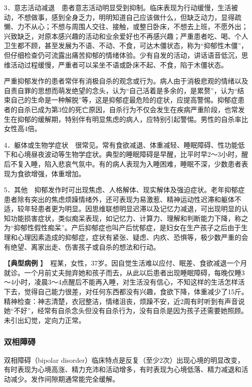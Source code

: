 3．意志活动减退　患者意志活动明显受到抑制。临床表现为行动缓慢，生活被动，不想做事，感到全身乏力，明明知道自己应该做什么，但缺乏动力，显得疏懒、力不从心；不想与周围人交往、接触，或整日卧床，不想去上班，不愿外出；兴致缺乏，对原本感兴趣的活动和业余爱好也不再感兴趣；严重患者吃、喝、个人卫生都不顾，甚至发展为不语、不动、不食，可达木僵状态，称为``抑郁性木僵''，但仔细检查仍可流露出痛苦抑郁的情绪体验。少有自发的活动，讲话语音低沉，思维活动过程缓慢，严重者可以呆坐不语或卧床不起、不食，陷于木僵状态。

严重抑郁发作的患者常伴有消极自杀的观念或行为。病人由于消极悲观的情绪以及自责自罪的思想而萌发绝望的念头，认为``自己活着是多余的，是累赘''，认为``结束自己的生命是一种解脱''等，这是抑郁症最危险的症状，应提高警惕。抑郁症患者的自杀已成为第3位的死亡原因，自杀行为不仅会发生在疾病严重阶段，也常发生在抑郁的缓解期，特别伴有明显焦虑的病人，应特别引起警惕。男性的自杀率比女性高4倍。

4．躯体或生物学症状　很常见。常有食欲减退、体重减轻、睡眠障碍、性功能低下和心境昼夜波动等生物学症状。典型的睡眠障碍是早醒，比平时早2～3小时，醒后不复入睡，陷入悲哀气氛中。有的病人表现为入睡困难，睡眠不深，少数患者表现为食欲增强，体重增加。

5．其他　抑郁发作时可出现焦虑、人格解体、现实解体及强迫症状。老年抑郁症患者除有突出的焦虑烦躁情绪外，还可表现为易激惹、精神运动性迟滞和躯体不适，较年轻患者更为明显。因思维联想明显迟滞以及记忆力减退，可出现明显的认知功能损害症状，类似痴呆表现，如记忆力、计算力、理解和判断能力下降，称之为``抑郁性假性痴呆''。产后抑郁症也叫产后忧郁症，是妇女在生产孩子之后由于生理和心理因素造成的抑郁症，症状有紧张、疑虑、内疚、恐惧等，极少数严重的会有绝望、离家出走、伤害孩子或自杀的想法和行动。

【\textbf{典型病例}
】　{程某，女性，37岁。因自觉生活难以应付、眠差、食欲减退一个月就诊。一个月前丈夫抛弃她和孩子而去，从此以后患者出现睡眠障碍，每晚仅睡3～4小时，凌晨3～4点醒后不能再入睡，对生活没有信心，不知这样的生活怎样活下去，觉得自己能力很差，对任何东西都没有兴趣，食欲下降，体重减少了15斤。精神检查：神志清楚，衣冠整洁，情绪沮丧，烦躁不安，近2周有时听到有声音说她``不好''，经常有自杀念头但没有自杀行为，没有自杀是因为孩子还需要她照顾。未引出幻觉，定向力正常。}

\subsubsection{双相障碍}

双相障碍（bipolar
disorder）临床特点是反复（至少2次）出现心境的明显改变，有时表现为心境高涨、精力充沛和活动增多，有时表现为心境低落、精力减退和活动减少。发作间隙期通常能完全缓解。

